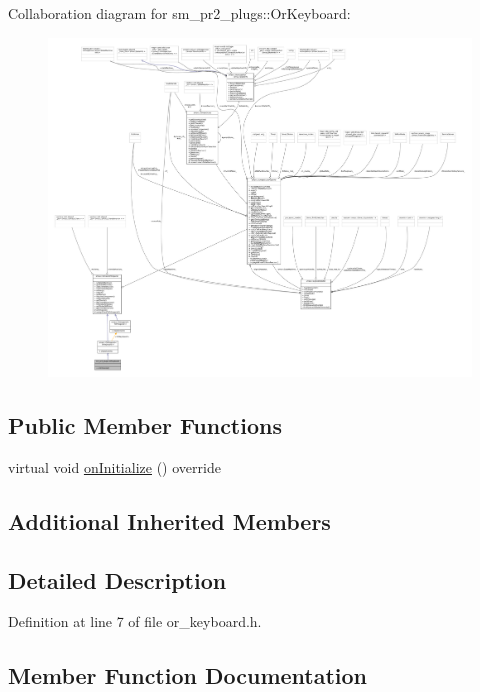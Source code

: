Collaboration diagram for sm\+\_\+pr2\+\_\+plugs\+:\+:Or\+Keyboard\+:
\nopagebreak
\begin{figure}[H]
\begin{center}
\leavevmode
\includegraphics[width=350pt]{classsm__pr2__plugs_1_1OrKeyboard__coll__graph}
\end{center}
\end{figure}
\subsection*{Public Member Functions}
\begin{DoxyCompactItemize}
\item 
virtual void \hyperlink{classsm__pr2__plugs_1_1OrKeyboard_ad54c87907039f7fb592aada01154353d}{on\+Initialize} () override
\end{DoxyCompactItemize}
\subsection*{Additional Inherited Members}


\subsection{Detailed Description}


Definition at line 7 of file or\+\_\+keyboard.\+h.



\subsection{Member Function Documentation}
\mbox{\label{classsm__pr2__plugs_1_1OrKeyboard_ad54c87907039f7fb592aada01154353d}} 
